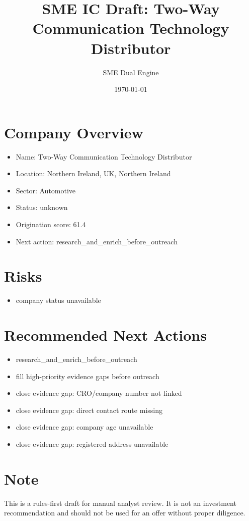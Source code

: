 \documentclass[11pt,a4paper]{article}
\title{SME IC Draft: Two-Way Communication Technology Distributor}
\author{SME Dual Engine}
\date{\today}
\begin{document}
\maketitle
\section*{Company Overview}
\begin{itemize}[leftmargin=1.4em]
\item Name: Two-Way Communication Technology Distributor
\item Location: Northern Ireland, UK, Northern Ireland
\item Sector: Automotive
\item Status: unknown
\item Origination score: 61.4
\item Next action: research\_and\_enrich\_before\_outreach
\end{itemize}
\section*{Risks}
\begin{itemize}[leftmargin=1.4em]
\item company status unavailable
\end{itemize}
\section*{Recommended Next Actions}
\begin{itemize}[leftmargin=1.4em]
\item research\_and\_enrich\_before\_outreach
\item fill high-priority evidence gaps before outreach
\item close evidence gap: CRO/company number not linked
\item close evidence gap: direct contact route missing
\item close evidence gap: company age unavailable
\item close evidence gap: registered address unavailable
\end{itemize}
\section*{Note}
This is a rules-first draft for manual analyst review. It is not an investment
recommendation and should not be used for an offer without proper diligence.
\end{document}
